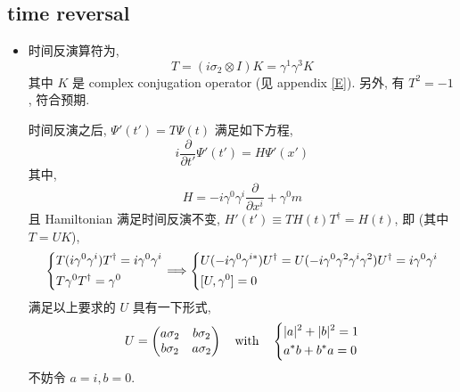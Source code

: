 \subsection{time reversal}
\begin{itemize}
	\item 时间反演算符为,
	\begin{equation}
		T = (i \sigma_2 \otimes I) K = \gamma^1 \gamma^3 K
	\end{equation}
	其中 $K$ 是 complex conjugation operator (见 appendix \ref{E}). 另外, 有 $T^2 = - 1$, 符合预期.
	
	\begin{tcolorbox}[title=proof:]
		时间反演之后, $\Psi'(t') = T \Psi(t)$ 满足如下方程,
		\begin{equation}
			i \frac{\partial}{\partial t'} \Psi'(t') = H \Psi'(x')
		\end{equation}
		其中,
		\begin{equation}
			H = - i \gamma^0 \gamma^i \frac{\partial}{\partial x^i} + \gamma^0 m
		\end{equation}
		且 Hamiltonian 满足时间反演不变, $H'(t') \equiv T H(t) T^\dag = H(t)$, 即 (其中 $T = U K$),
		\begin{equation}
			\begin{dcases}
				T (i \gamma^0 \gamma^i) T^\dag = i \gamma^0 \gamma^i \\
				T \gamma^0 T^\dag = \gamma^0
			\end{dcases} \Longrightarrow \begin{dcases}
				U (- i \gamma^0 \gamma^{i *}) U^\dag = U (- i \gamma^0 \gamma^2 \gamma^i \gamma^2) U^\dag = i \gamma^0 \gamma^i \\
				[U, \gamma^0] = 0
			\end{dcases}
		\end{equation}
		满足以上要求的 $U$ 具有一下形式,
		\begin{equation}
			U = \begin{pmatrix}
				a \sigma_2 & b \sigma_2 \\
				b \sigma_2 & a \sigma_2
			\end{pmatrix} \quad \text{with} \quad \begin{dcases}
				|a|^2 + |b|^2 = 1 \\
				a^* b + b^* a = 0
			\end{dcases}
		\end{equation}
		不妨令 $a = i, b = 0$.
	\end{tcolorbox}
\end{itemize}

